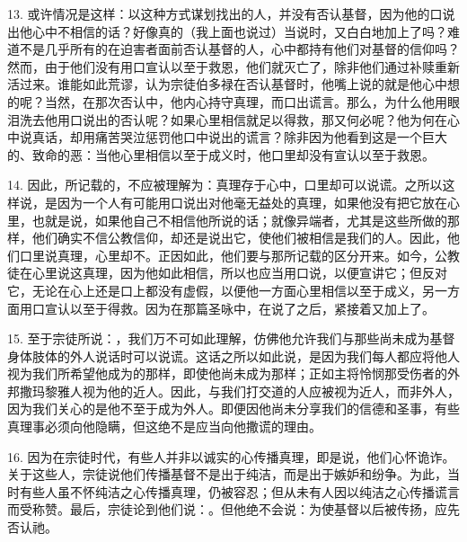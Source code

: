 13. 或许情况是这样：以这种方式谋划找出的人，并没有否认基督，因为他的口说出他心中不相信的话？好像真的（我上面也说过）当说时，又白白地加上了吗？难道不是几乎所有的在迫害者面前否认基督的人，心中都持有他们对基督的信仰吗？然而，由于他们没有用口宣认以至于救恩，他们就灭亡了，除非他们通过补赎重新活过来。谁能如此荒谬，认为宗徒伯多禄在否认基督时，他嘴上说的就是他心中想的呢？当然，在那次否认中，他内心持守真理，而口出谎言。那么，为什么他用眼泪洗去他用口说出的否认呢？如果心里相信就足以得救，那又何必呢？他为何在心中说真话，却用痛苦哭泣惩罚他口中说出的谎言？除非因为他看到这是一个巨大的、致命的恶：当他心里相信以至于成义时，他口里却没有宣认以至于救恩。\par

14. 因此，所记载的，不应被理解为：真理存于心中，口里却可以说谎。之所以这样说，是因为一个人有可能用口说出对他毫无益处的真理，如果他没有把它放在心里，也就是说，如果他自己不相信他所说的话；就像异端者，尤其是这些所做的那样，他们确实不信公教信仰，却还是说出它，使他们被相信是我们的人。因此，他们口里说真理，心里却不。正因如此，他们要与那所记载的区分开来。如今，公教徒在心里说这真理，因为他如此相信，所以也应当用口说，以便宣讲它；但反对它，无论在心上还是口上都没有虚假，以便他一方面心里相信以至于成义，另一方面用口宣认以至于得救。因为在那篇圣咏中，在说了之后，紧接着又加上了。\par

15. 至于宗徒所说：，我们万不可如此理解，仿佛他允许我们与那些尚未成为基督身体肢体的外人说话时可以说谎。这话之所以如此说，是因为我们每人都应将他人视为我们所希望他成为的那样，即使他尚未成为那样；正如主将怜悯那受伤者的外邦撒玛黎雅人视为他的近人。因此，与我们打交道的人应被视为近人，而非外人，因为我们关心的是他不至于成为外人。即便因他尚未分享我们的信德和圣事，有些真理事必须向他隐瞒，但这绝不是应当向他撒谎的理由。\par

16. 因为在宗徒时代，有些人并非以诚实的心传播真理，即是说，他们心怀诡诈。关于这些人，宗徒说他们传播基督不是出于纯洁，而是出于嫉妒和纷争。为此，当时有些人虽不怀纯洁之心传播真理，仍被容忍；但从未有人因以纯洁之心传播谎言而受称赞。最后，宗徒论到他们说：。但他绝不会说：为使基督以后被传扬，应先否认祂。\par


